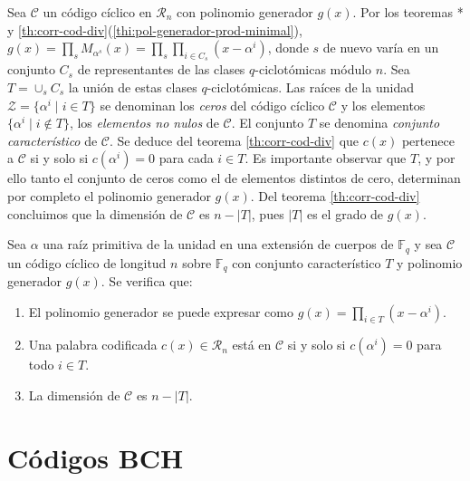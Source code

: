 Sea \(\mathcal C\) un código cíclico en \(\mathcal R_n\) con polinomio generador \(g(x)\).
Por los teoremas * y \ref{th:corr-cod-div}(\ref{thi:pol-generador-prod-minimal}), \(g(x) = \prod_{s}M_{\alpha^s}(x) = \prod_s\prod_{i \in C_s}(x - \alpha^{i})\), donde \(s\) de nuevo varía en un conjunto \(C_s\) de representantes de las clases \(q\)-ciclotómicas módulo \(n\).
Sea \(T = \cup_s C_s\) la unión de estas clases \(q\)-ciclotómicas.
Las raíces de la unidad \(\mathcal Z = \{\alpha^{i} \mid i \in T\}\) se denominan los \textit{ceros} del código cíclico \(\mathcal C\) y los elementos \(\{\alpha^{i} \mid i \notin T\}\), los \textit{elementos no nulos} de \(\mathcal C\).
El conjunto \(T\) se denomina \textit{conjunto característico} de \(\mathcal C\).
Se deduce del teorema \ref{th:corr-cod-div} que \(c(x)\) pertenece a \(\mathcal C\) si y solo si \(c(\alpha^{i}) = 0\) para cada \(i \in T\).
Es importante observar que \(T\), y por ello tanto el conjunto de ceros como el de elementos distintos de cero, determinan por completo el polinomio generador \(g(x)\).
Del teorema \ref{th:corr-cod-div} concluimos que la dimensión de \(\mathcal C\) es \(n - |T|\), pues \(|T|\) es el grado de \(g(x)\).


\begin{theorem}
  \label{th:cicl-cto-caracteristico}
  Sea \(\alpha\) una raíz primitiva de la unidad en una extensión de cuerpos de \(\mathbb F_q\) y sea \(\mathcal C\) un código cíclico de longitud \(n\) sobre \(\mathbb F_q\) con conjunto característico \(T\) y polinomio generador \(g(x)\).
  Se verifica que: \begin{enumerate}
    \item El polinomio generador se puede expresar como \(g(x) = \prod_{i \in T}(x - \alpha^i)\).
    \item Una palabra codificada \(c(x) \in \mathcal R_n\) está en \(\mathcal C\) si y solo si \(c(\alpha^i) = 0\) para todo \(i \in T\).
    \item La dimensión de \(\mathcal C\) es \(n - |T|\).
  \end{enumerate}
\end{theorem}


\section{Códigos BCH}

